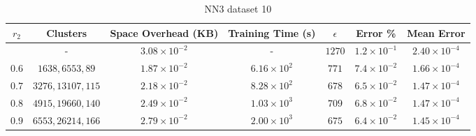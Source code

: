\begin{adjustwidth}{-1.5cm}{}
\begin{table}
\caption{NN3 dataset 10}\label{ws310}
\begin{tabular}{ccccccc}
\hline
\toprule
$r_2$ & Clusters & Space Overhead (KB) & Training Time (s) & $\epsilon$ & Error \% & Mean Error\\
\midrule
& - & $3.08 \times 10^{-2}$ & - & $1270$ & $1.2 \times 10^{-1}$ & $2.40 \times 10^{-4}$\\
$0.6$ & $1638, 6553, 89$ & $1.87 \times 10^{-2}$ & $6.16 \times 10^2$ & $771$ & $7.4 \times 10^{-2}$ & $1.66 \times 10^{-4}$\\
$0.7$ & $3276, 13107, 115$ & $2.18 \times 10^{-2}$ & $8.28 \times 10^2$ & $678$ & $6.5 \times 10^{-2}$ & $1.47 \times 10^{-4}$\\
$0.8$ & $4915, 19660, 140$ & $2.49 \times 10^{-2}$ & $1.03 \times 10^3$ & $709$ & $6.8 \times 10^{-2}$ & $1.47 \times 10^{-4}$\\
$0.9$ & $6553, 26214, 166$ & $2.79 \times 10^{-2}$ & $2.00 \times 10^3$ & $675$ & $6.4 \times 10^{-2}$ & $1.45 \times 10^{-4}$\\
\bottomrule
\end{tabular}
\end{table}
\end{adjustwidth}